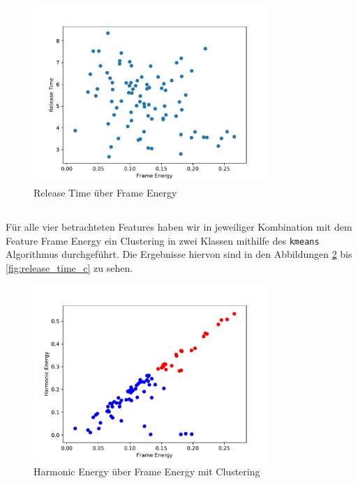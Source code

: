 \begin{figure}[H]
    \center
    \includegraphics[width = 0.8\textwidth]{Figures/rel.pdf}
    \caption{Release Time über Frame Energy}
    \label{fig:release_time}
\end{figure}

\subsection{}
Für alle vier betrachteten Features haben wir in jeweiliger Kombination mit dem Feature Frame Energy ein Clustering in zwei Klassen mithilfe des \texttt{kmeans} Algorithmus durchgeführt.
Die Ergebnisse hiervon sind in den Abbildungen \ref{fig:harmonic_energy_c} bis \ref{fig:release_time_c} zu sehen.

\begin{figure}[H]
    \center
    \includegraphics[width = 0.8\textwidth]{Figures/harmonic_energy_c}
    \caption{Harmonic Energy über Frame Energy mit Clustering }
    \label{fig:harmonic_energy_c}
\end{figure}


